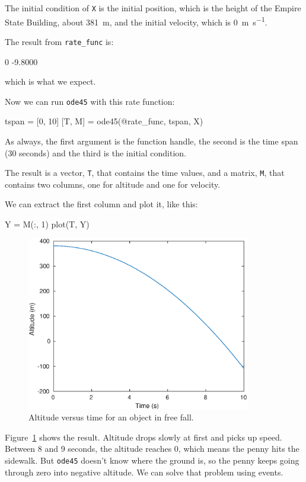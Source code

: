 \documentclass[
]{book}
\numberwithin{Answer}{chapter}
\numberwithin{Exercise}{chapter}
\begin{document}
The initial condition of {\tt X} is the initial position, which is the height of the Empire State Building, about \SI{381}{\meter}, and the initial velocity, which is \SI{0}{\meter \per \second}.

The result from \verb"rate_func" is:

\begin{code}
    0
   -9.8000
\end{code}

which is what we expect.

Now we can run {\tt ode45} with this rate function:

\begin{code}
tspan = [0, 10]
[T, M] = ode45(@rate_func, tspan, X)
\end{code}

As always, the first argument is the function handle, the second
is the time span (30 seconds) and the third is the initial
condition.

The result is a vector, {\tt T}, that contains the time values, and a matrix, {\tt M}, that contains two columns, one for altitude and one for velocity.

We can extract the first column and plot it, like this:

\begin{code}
Y = M(:, 1)
plot(T, Y)
\end{code}


\begin{figure}
\centerline{\includegraphics[height=3in]{figs/penny.eps}}
\caption{Altitude versus time for an object in free fall.}
\label{fig:penny}
\end{figure}

Figure~\ref{fig:penny} shows the result.  Altitude drops slowly at first and picks up speed.  Between 8 and 9 seconds, the altitude reaches 0, which means the penny hits the sidewalk.  But {\tt ode45} doesn't know where the ground is, so the penny keeps going through zero into negative altitude.  We can solve that problem using events.
\end{document}
